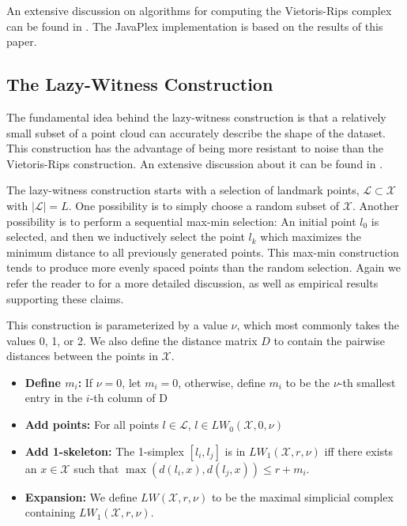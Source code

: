 \documentclass[10pt]{article}
\begin{document}
An extensive discussion on algorithms for computing the Vietoris-Rips complex can be found in \cite{Zomorodian}. The JavaPlex implementation is based on the results of this paper.

\subsection{The Lazy-Witness Construction}
The fundamental idea behind the lazy-witness construction is that a relatively small subset of a point cloud can accurately describe the shape of the dataset. This construction has the advantage of being more resistant to noise than the Vietoris-Rips construction. An extensive discussion about it can be found in \cite{Witness}. 

The lazy-witness construction starts with a selection of landmark points, $\mathcal{L} \subset \mathcal{X}$ with $|\mathcal{L}| = L$. One possibility is to simply choose a random subset of $\mathcal{X}$. Another possibility is to perform a sequential max-min selection: An initial point $l_0$ is selected, and then we inductively select the point $l_k$ which maximizes the minimum distance to all previously generated points. This max-min construction tends to produce more evenly spaced points than the random selection. Again we refer the reader to \cite{Witness} for a more detailed discussion, as well as empirical results supporting these claims.

This construction is parameterized by a value $\nu$, which most commonly takes the values 0, 1, or 2. We also define the distance matrix $D$ to contain the pairwise distances between the points in $\mathcal{X}$. 

\begin{itemize}
\item {\bf Define $m_i$:} If $\nu = 0$, let $m_i = 0$, otherwise, define $m_i$ to be the $\nu$-th smallest entry in the $i$-th column of D
\item {\bf Add points:} For all points $l \in \mathcal{L}$, $l \in LW_0(\mathcal{X}, 0, \nu)$
\item {\bf Add 1-skeleton:} The 1-simplex $[l_i, l_j]$ is in $LW_1(\mathcal{X}, r, \nu)$ iff there exists an $x \in \mathcal{X}$ such that $\max(d(l_i, x), d(l_j, x)) \leq r + m_i$.
\item {\bf Expansion:} We define $LW(\mathcal{X}, r, \nu)$ to be the maximal simplicial complex containing $LW_1(\mathcal{X}, r, \nu)$. 
\end{itemize}
\end{document}
